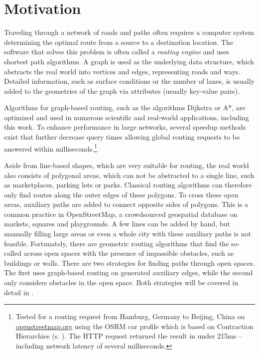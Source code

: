 
\section{Motivation}

	Traveling through a network of roads and paths often requires a computer system determining the optimal route from a source to a destination location.
	The software that solves this problem is often called a \emph{routing engine} and uses shortest path algorithms.
	A graph is used as the underlying data structure, which abstracts the real world into vertices and edges, representing roads and ways.
	Detailed information, such as surface conditions or the number of lanes, is usually added to the geometries of the graph via attributes (usually key-value pairs).
	
	Algorithms for graph-based routing, such as the algorithms Dijkstra or A*, are optimized and used in numerous scientific and real-world applications, including this work.
	To enhance performance in large networks, several speedup methods exist that further decrease query times allowing global routing requests to be answered within milliseconds.\footnote{Tested for a routing request from Hamburg, Germany to Beijing, China on \href{https://www.openstreetmap.org/directions?engine=fossgis\_osrm\_car&route=53.55\%2C10.00\%3B39.91\%2C116.39}{openstreetmap.org} using the OSRM car profile which is based on Contraction Hierarchies (s. ). The HTTP request returned the result in under 215ms -- including network latency of several milliseconds.}
	
	Aside from line-based shapes, which are very suitable for routing, the real world also consists of polygonal areas, which can not be abstracted to a single line, such as marketplaces, parking lots or parks.
	Classical routing algorithms can therefore only find routes along the outer edges of these polygons.
	To cross these open areas, auxiliary paths are added to connect opposite sides of polygons.
	This is a common practice in OpenStreetMap, a crowdsourced geospatial database on markets, squares and playgrounds.
	A few lines can be added by hand, but manually filling large areas or even a whole city with these auxiliary paths is not feasible.
	Fortunately, there are geometric routing algorithms that find the so-called  across open spaces with the presence of impassible obstacles, such as buildings or walls.
	There are two strategies for finding paths through open spaces. The first uses graph-based routing on generated auxiliary edges, while the second only considers obstacles in the open space.
	Both strategies will be covered in detail in .
	
